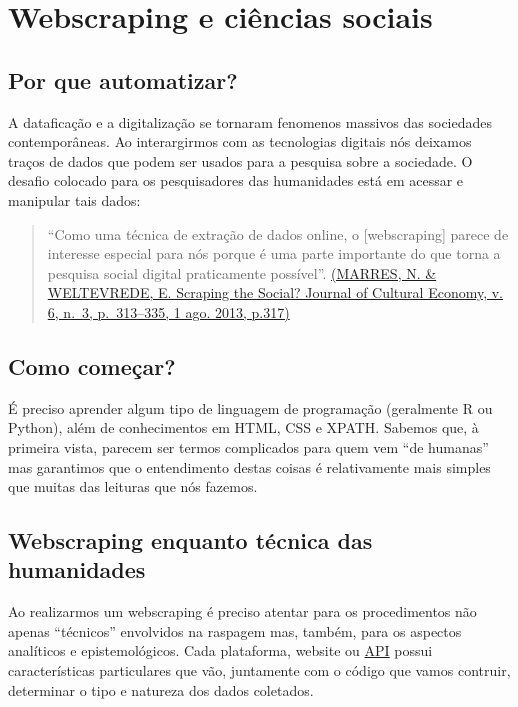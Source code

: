\documentclass[
]{book}
\begin{document}
\hypertarget{webscraping-e-ciuxeancias-sociais}{%
\chapter{Webscraping e ciências sociais}\label{webscraping-e-ciuxeancias-sociais}}

\hypertarget{por-que-automatizar}{%
\section{Por que automatizar?}\label{por-que-automatizar}}

A dataficação e a digitalização se tornaram fenomenos massivos das sociedades contemporâneas. Ao interargirmos com as tecnologias digitais nós deixamos traços de dados que podem ser usados para a pesquisa sobre a sociedade. O desafio colocado para os pesquisadores das humanidades está em acessar e manipular tais dados:

\begin{quote}
``Como uma técnica de extração de dados online, o {[}webscraping{]} parece de interesse especial para nós porque é uma parte importante do que torna a pesquisa social digital praticamente possível''. \href{https://www.tandfonline.com/doi/abs/10.1080/17530350.2013.772070}{(MARRES, N. \& WELTEVREDE, E. Scraping the Social? Journal of Cultural Economy, v. 6, n.~3, p.~313--335, 1 ago. 2013, p.317)}
\end{quote}

\hypertarget{como-comeuxe7ar}{%
\section{Como começar?}\label{como-comeuxe7ar}}

É preciso aprender algum tipo de linguagem de programação (geralmente R ou Python), além de conhecimentos em HTML, CSS e XPATH. Sabemos que, à primeira vista, parecem ser termos complicados para quem vem ``de humanas'' mas garantimos que o entendimento destas coisas é relativamente mais simples que muitas das leituras que nós fazemos.

\hypertarget{webscraping-enquanto-tuxe9cnica-das-humanidades}{%
\section{Webscraping enquanto técnica das humanidades}\label{webscraping-enquanto-tuxe9cnica-das-humanidades}}

Ao realizarmos um webscraping é preciso atentar para os procedimentos não apenas ``técnicos'' envolvidos na raspagem mas, também, para os aspectos analíticos e epistemológicos. Cada plataforma, website ou \href{https://canaltech.com.br/software/o-que-e-api/}{API} possui características particulares que vão, juntamente com o código que vamos contruir, determinar o tipo e natureza dos dados coletados.
\end{document}
